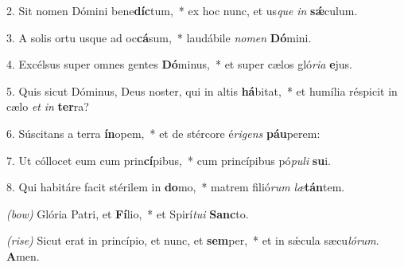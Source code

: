 2. Sit nomen Dómini bene\textbf{díc}tum,~* ex hoc nunc, et us\textit{que} \textit{in} \textbf{sǽ}culum.

3. A solis ortu usque ad oc\textbf{cá}sum,~* laudábile \textit{no}\textit{men} \textbf{Dó}mini.

4. Excélsus super omnes gentes \textbf{Dó}minus,~* et super cælos gló\textit{ri}\textit{a} \textbf{e}jus.

5. Quis sicut Dóminus, Deus noster, qui in altis \textbf{há}bitat,~* et humília réspicit in cælo \textit{et} \textit{in} \textbf{ter}ra?

6. Súscitans a terra \textbf{ín}opem,~* et de stércore é\textit{ri}\textit{gens} \textbf{páu}perem:

7. Ut cóllocet eum cum prin\textbf{cí}pibus,~* cum princípibus pó\textit{pu}\textit{li} \textbf{su}i.

8. Qui habitáre facit stérilem in \textbf{do}mo,~* matrem filió\textit{rum} \textit{læ}\textbf{tán}tem.

{\color{red}\textit{(bow)}} Glória Patri, et \textbf{Fí}lio,~* et Spirí\textit{tu}\textit{i} \textbf{Sanc}to.

{\color{red}\textit{(rise)}} Sicut erat in princípio, et nunc, et \textbf{sem}per,~* et in s\'{\ae}cula sæcu\textit{ló}\textit{rum}. \textbf{A}men.
